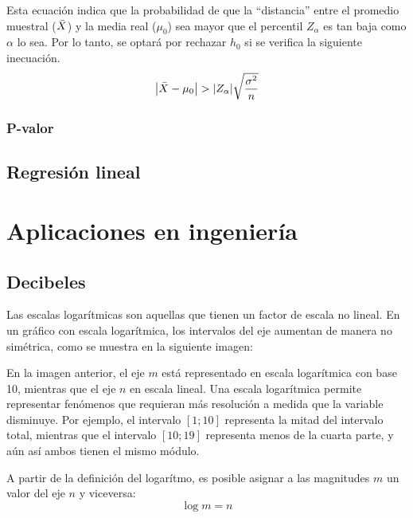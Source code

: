 \documentclass[a5paper,12pt,twoside]{book}
\begin{document}
Esta ecuación indica que la probabilidad de que la ``distancia'' entre el promedio muestral ($\bar{X}$) y la media real ($\mu_0$) sea mayor que el percentil $Z_\alpha$ es tan baja como $\alpha$ lo sea.
Por lo tanto, se optará por rechazar $h_0$ si se verifica la siguiente inecuación.
\begin{equation*}
    {\left| {\bar{X}-\mu_0} \right|} > {\left| {Z_\alpha} \right|} \sqrt{\dfrac{\sigma^2}{n}}
\end{equation*}


\subsection{P-valor}


\section{Regresión lineal}



\appendix


\chapter{Aplicaciones en ingeniería}


\section{Decibeles}

Las escalas logarítmicas son aquellas que tienen un factor de escala no lineal. En un gráfico con escala logarítmica, los intervalos del eje aumentan de manera no simétrica, como se muestra en la siguiente imagen:

\begin{center}
\end{center}

En la imagen anterior, el eje $m$ está representado en escala logarítmica con base 10, mientras que el eje $n$ en escala lineal. Una escala logarítmica permite representar fenómenos que requieran más resolución a medida que la variable disminuye. Por ejemplo, el intervalo $[1;10]$ representa la mitad del intervalo total, mientras que el intervalo $[10;19]$ representa menos de la cuarta parte, y aún así ambos tienen el mismo módulo.

A partir de la definición del logarítmo, es posible asignar a las magnitudes $m$ un valor del eje $n$ y viceversa:
\begin{equation*}
    \log{m}=n
\end{equation*}
\end{document}
